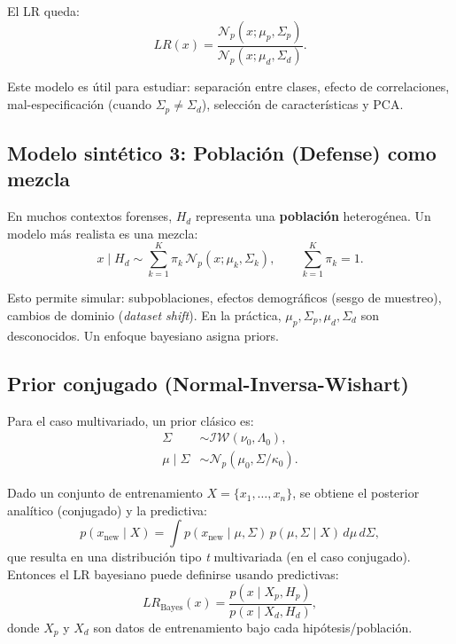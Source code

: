 \documentclass[a4paper,10pt,oneside]{article}
\begin{document}
El LR queda:
\begin{equation}
LR(x)=\frac{\mathcal{N}_p(x;\mu_p,\Sigma_p)}{\mathcal{N}_p(x;\mu_d,\Sigma_d)}.
\end{equation}

Este modelo es \'util para estudiar: separaci\'on entre clases, efecto de correlaciones, mal-especificaci\'on (cuando $\Sigma_p\neq \Sigma_d$), selecci\'on de caracter\'isticas y PCA.

\subsection{Modelo sint\'etico 3: Poblaci\'on (Defense) como mezcla}

En muchos contextos forenses, $H_d$ representa una \textbf{poblaci\'on} heterog\'enea. Un modelo m\'as realista es una mezcla:
\begin{equation}
x\mid H_d \sim \sum_{k=1}^{K}\pi_k\,\mathcal{N}_p(x;\mu_k,\Sigma_k),
\qquad \sum_{k=1}^K \pi_k = 1.
\end{equation}

Esto permite simular: subpoblaciones, efectos demogr\'aficos (sesgo de muestreo), cambios de dominio (\textit{dataset shift}). En la pr\'actica, $\mu_p,\Sigma_p,\mu_d,\Sigma_d$ son desconocidos. Un enfoque bayesiano asigna priors.

\subsection{Prior conjugado (Normal-Inversa-Wishart)}
Para el caso multivariado, un prior cl\'asico es:
\begin{align}
\Sigma &\sim \mathcal{IW}(\nu_0,\Lambda_0),\\
\mu\mid \Sigma &\sim \mathcal{N}_p(\mu_0,\Sigma/\kappa_0).
\end{align}

Dado un conjunto de entrenamiento $X=\{x_1,\dots,x_n\}$, se obtiene el posterior anal\'itico (conjugado) y la predictiva:
\begin{equation}
p(x_{\text{new}}\mid X) = \int p(x_{\text{new}}\mid \mu,\Sigma)\,p(\mu,\Sigma\mid X)\,d\mu\,d\Sigma,
\end{equation}
que resulta en una distribuci\'on tipo \textit{t} multivariada (en el caso conjugado). Entonces el LR bayesiano puede definirse usando predictivas:
\begin{equation}
LR_{\text{Bayes}}(x)=\frac{p(x\mid X_p,H_p)}{p(x\mid X_d,H_d)},
\end{equation}
donde $X_p$ y $X_d$ son datos de entrenamiento bajo cada hip\'otesis/poblaci\'on.
\end{document}

